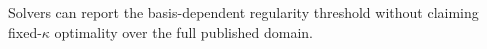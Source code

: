 Solvers can report the basis-dependent regularity threshold without claiming fixed-\(\kappa\) optimality over the full published domain.